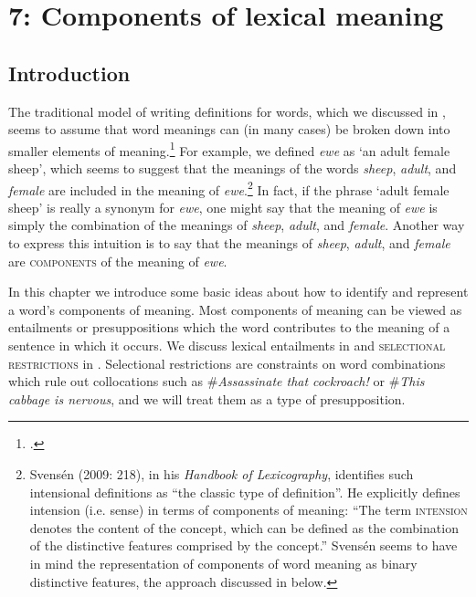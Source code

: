 \chapter{{7}: Components of lexical meaning}

\section{Introduction}\label{sec:} %

The traditional model of writing definitions for words, which we discussed in , seems to assume that word meanings can (in many cases) be broken down into smaller elements of meaning.\footnote{\citet[126]{Engelberg2011}.} For example, we defined \textit{ewe} as ‘an adult female sheep’, which seems to suggest that the meanings of the words \textit{sheep}, \textit{adult}, and \textit{female} are included in the meaning of \textit{ewe}.\footnote{Svensén (2009: 218), in his \textit{Handbook of Lexicography}, identifies such intensional definitions as “the classic type of definition”. He explicitly defines intension (i.e. sense) in terms of components of meaning: “The term \textsc{intension} denotes the content of the concept, which can be defined as the combination of the distinctive features comprised by the concept.” Svensén seems to have in mind the representation of components of word meaning as binary distinctive features, the approach discussed in  below.} In fact, if the phrase ‘adult female sheep’ is really a synonym for \textit{ewe}, one might say that the meaning of \textit{ewe} is simply the combination of the meanings of \textit{sheep}, \textit{adult}, and \textit{female}. Another way to express this intuition is to say that the meanings of \textit{sheep}, \textit{adult}, and \textit{female} are \textsc{components} of the meaning of \textit{ewe}.



In this chapter we introduce some basic ideas about how to identify and represent a word’s components of meaning. Most components of meaning can be viewed as entailments or presuppositions which the word contributes to the meaning of a sentence in which it occurs. We discuss lexical entailments in  and \textsc{selectional restrictions} in . Selectional restrictions are constraints on word combinations which rule out collocations such as \#\textit{Assassinate that cockroach!} or \#\textit{This cabbage is nervous}, and we will treat them as a type of presupposition.



